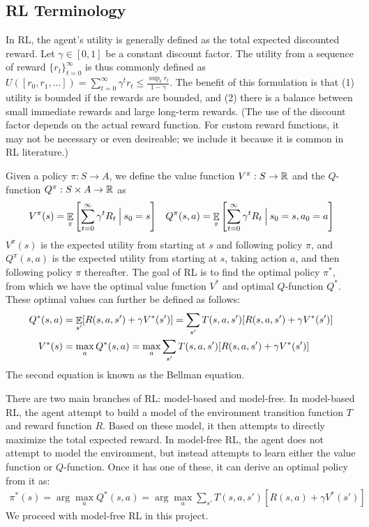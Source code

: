 \subsection{RL Terminology}

In RL, the agent's utility is generally defined as the total expected discounted reward.
Let $\gamma \in [0, 1]$ be a constant discount factor. The utility from a sequence of reward $\{r_t\}_{t=0}^\infty$ is
thus commonly defined as $U([r_0, r_1, \ldots]) = \sum_{t=0}^\infty \gamma^t r_t \leq \frac{\sup_t r_t}{1-\gamma}$.
The benefit of this formulation is that (1) utility is bounded if the rewards are bounded, and (2) there is a balance
between small immediate rewards and large long-term rewards. (The use of the discount factor depends on the actual reward function.
For custom reward functions, it may not be necessary or even desireable; we include it because it is common in RL literature.)

Given a policy $\pi: S \to A$, we define the value function $V^\pi: S \to \mathbb{R}$ and the $Q$-function $Q^\pi: S \times A \to \mathbb{R}$ as
\begin{align*}
  V^\pi(s) = \mathop{\mathbb{E}}_\pi\left[ \sum_{t=0}^\infty \gamma^t R_t \:\Big|\: s_0 = s  \right] &&
  Q^\pi(s, a) = \mathop{\mathbb{E}}_\pi\left[  \sum_{t=0}^\infty \gamma^t R_t \:\Big|\: s_0 = s, a_0 = a \right]
\end{align*}
$V^\pi(s)$ is the expected utility from starting at $s$ and following policy $\pi$, and $Q^\pi(s, a)$ is the expected utility
from starting at $s$, taking action $a$, and then following policy $\pi$ thereafter.
The goal of RL is to find the optimal policy $\pi^*$, from which we have the optimal value function $V^*$ and optimal $Q$-function $Q^*$.
These optimal values can further be defined as follows:
\begin{align*}
  Q^*(s, a) &= \mathop{\mathbb{E}}_{s'}[R(s, a, s') + \gamma V^*(s')] = \sum_{s'} T(s, a, s')[R(s, a, s') + \gamma V^*(s')] \\
  V^*(s) &= \max_a Q^*(s, a) = \max_a \sum_{s'} T(s, a, s')[R(s, a, s') + \gamma V^*(s')]
\end{align*}
The second equation is known as the Bellman equation.

There are two main branches of RL: model-based and model-free.
In model-based RL, the agent attempt to build a model of the environment transition function $T$ and reward function $R$.
Based on these model, it then attempts to directly maximize the total expected reward.
In model-free RL, the agent does not attempt to model the environment, but instead attempts to learn either the value function or $Q$-function.
Once it has one of these, it can derive an optimal policy from it as:
\begin{align*}
  \pi^*(s) = \arg\max_a Q^*(s, a) = \arg\max_a \sum_{s'} T(s, a, s')\left[ R(s, a) + \gamma V^*(s')\right]
\end{align*}
We proceed with model-free RL in this project.

